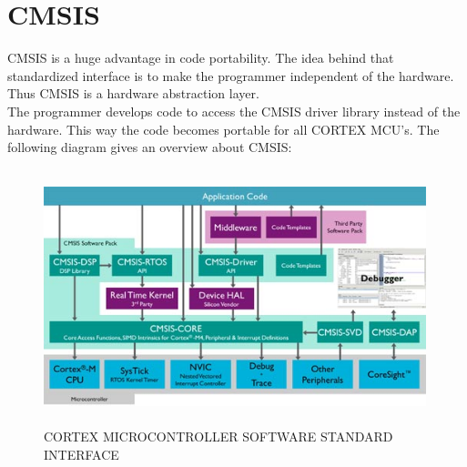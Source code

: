 \chapter{CMSIS}
CMSIS is a huge advantage in code portability. The idea behind that standardized
interface is to make the programmer independent of the hardware. Thus CMSIS is a
hardware abstraction layer.\\
The programmer develops code to access the CMSIS driver library instead of the
hardware. This way the code becomes portable for all CORTEX MCU's.
The following diagram gives an overview about CMSIS:\citep{ARM-CMSIS}\\

\begin{figure}[ht]
	\centering
	\includegraphics[width=420px, height=280px]{../img/cmsis.jpg}
	\caption{CORTEX MICROCONTROLLER SOFTWARE STANDARD INTERFACE}
	\label{cmsis_}
\end{figure}
